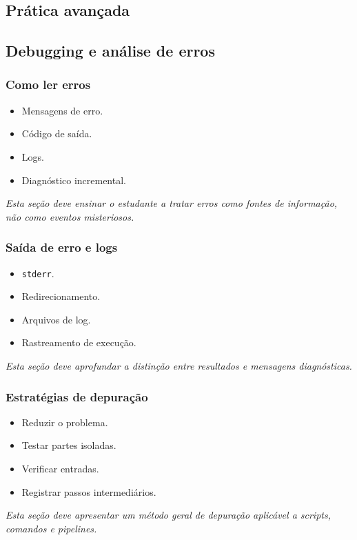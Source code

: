 \documentclass[12pt,openany]{book}
\newcommand{\placeholder}[1]{
    \par\medskip
    \noindent\textit{#1}
    \par\medskip
}
\newcommand{\topicos}[1]{
    \begin{itemize}
        #1
    \end{itemize}
}
\begin{document}
\begin{refsection}
\part{Prática avançada}

\chapter{Debugging e análise de erros}

\section{Como ler erros}

\topicos{
    \item Mensagens de erro.
    \item Código de saída.
    \item Logs.
    \item Diagnóstico incremental.
}

\placeholder{Esta seção deve ensinar o estudante a tratar erros como fontes de informação, não como eventos misteriosos.}

\section{Saída de erro e logs}

\topicos{
    \item \texttt{stderr}.
    \item Redirecionamento.
    \item Arquivos de log.
    \item Rastreamento de execução.
}

\placeholder{Esta seção deve aprofundar a distinção entre resultados e mensagens diagnósticas.}

\section{Estratégias de depuração}

\topicos{
    \item Reduzir o problema.
    \item Testar partes isoladas.
    \item Verificar entradas.
    \item Registrar passos intermediários.
}

\placeholder{Esta seção deve apresentar um método geral de depuração aplicável a scripts, comandos e pipelines.}


\end{refsection}
\end{document}
